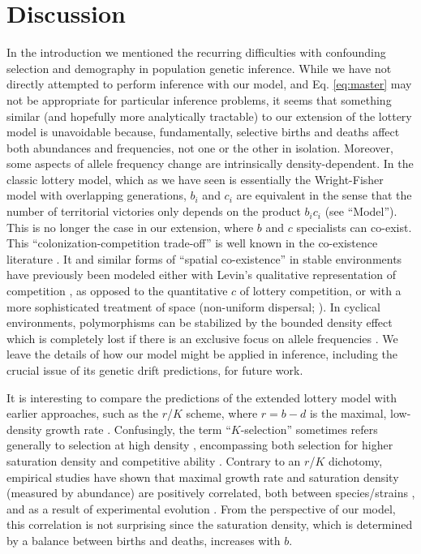 \documentclass[11pt]{article}
\begin{document}
\section*{Discussion}

In the introduction we mentioned the recurring difficulties with confounding selection and demography in population genetic inference. While we have not directly attempted to perform inference with our model, and Eq. \eqref{eq:master} may not be appropriate for particular inference problems, it seems that something similar (and hopefully more analytically tractable) to our extension of the lottery model is unavoidable because, fundamentally, selective births and deaths affect both  abundances and frequencies, not one or the other in isolation. Moreover, some aspects of allele frequency change are intrinsically density-dependent. In the classic lottery model, which as we have seen is essentially the Wright-Fisher model with overlapping generations, $b_i$ and $c_i$ are  equivalent in the sense that the number of territorial victories only depends on the product $b_i c_i$ (see ``Model''). This is no longer the case in our extension, where $b$ and $c$ specialists can co-exist. This ``colonization-competition trade-off'' is well known in the co-existence literature \citep{tilman_94}. It and similar forms of ``spatial co-existence'' in stable environments have previously been modeled either with Levin's  qualitative representation of competition \citep{levins_71,tilman_94}, as opposed to the quantitative $c$ of lottery competition, or with a more sophisticated treatment of space (non-uniform dispersal; \citealt{shmida_84,bolker_99}). In cyclical environments, polymorphisms can be stabilized by the bounded density effect which is  completely lost if there is an exclusive focus on allele frequencies \citep{yi_2013}. We leave the details of how our model might be applied in inference, including the crucial issue of its genetic drift predictions, for future work. 

It is interesting to compare the predictions of the extended lottery model with earlier approaches, such as the $r$/$K$ scheme, where $r=b-d$ is the maximal, low-density growth rate \citep{pianka_1972}. Confusingly, the term ``$K$-selection'' sometimes refers generally to selection at high density \citep{pianka_1972}, encompassing both selection for higher saturation density \citep{macarthur_1967} and competitive ability \citep{gill_1974}. Contrary to an $r$/$K$ dichotomy, empirical studies have shown that maximal growth rate and saturation density (measured by abundance) are positively correlated, both between species/strains \citep{luckinbill_1979,kuno_1991,hendriks_2005,fitzsimmons_2010}, and as a result of experimental evolution \citep{luckinbill_1978,luckinbill_1979}. From the perspective of our model, this correlation is not surprising since the saturation density, which is determined by a balance between births and deaths, increases with $b$. 
\end{document}
